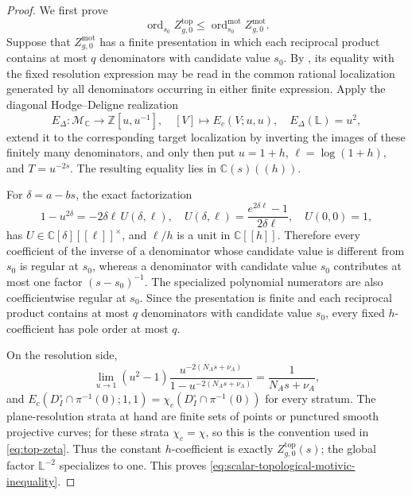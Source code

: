 \documentclass[12pt]{amsart}
\numberwithin{equation}{section}
\theoremstyle{plain}
\theoremstyle{definition}
\theoremstyle{remark}
\theoremstyle{definition}
\DeclareMathOperator{\ord}{ord}
\newcommand{\C}{\mathbb C}
\newcommand{\Z}{\mathbb Z}
\newcommand{\Lef}{\mathbb L}
\newcommand{\Mmot}{\mathcal M_{\mathbb C}}
\begin{document}
\begin{proof}
We first prove
\begin{equation}\label{eq:scalar-topological-motivic-inequality}
 \ord_{s_0}Z^{\mathrm{top}}_{g,0}\leq\ord_{s_0}^{\mathrm{mot}}Z^{\mathrm{mot}}_{g,0}.
\end{equation}
Suppose that $Z^{\mathrm{mot}}_{g,0}$ has a finite presentation in which each reciprocal product contains at most $q$ denominators with candidate value $s_0$. By , its equality with the fixed resolution expression may be read in the common rational localization generated by all denominators occurring in either finite expression. Apply the diagonal Hodge--Deligne realization \cite[\S4.2]{DenefLoeser1998}
\begin{equation*}
E_\Delta:\Mmot\to \Z[u,u^{-1}],
 \quad [V]\mapsto  E_c(V;u,u),
 \quad E_\Delta(\Lef)=u^2,
\end{equation*}
extend it to the corresponding target localization by inverting the images of these finitely many denominators, and only then put $u=1+h$, $\ell=\log(1+h)$, and $T=u^{-2s}$. The resulting equality lies in $\C(s)((h))$.

For $\delta=a-bs$, the exact factorization
\begin{equation*}
1-u^{2\delta}=-2\delta\ell\,U(\delta,\ell),
 \quad U(\delta,\ell)=\frac{e^{2\delta\ell}-1}{2\delta\ell},
 \quad U(0,0)=1,
\end{equation*}
has $U\in\C[\delta][\![\ell]\!]^\times$, and $\ell/h$ is a unit in $\C[\![h]\!]$. Therefore every coefficient of the inverse of a denominator whose candidate value is different from $s_0$ is regular at $s_0$, whereas a denominator with candidate value $s_0$ contributes at most one factor $(s-s_0)^{-1}$. The specialized polynomial numerators are also coefficientwise regular at $s_0$. Since the presentation is finite and each reciprocal product contains at most $q$ denominators with candidate value $s_0$, every fixed $h$-coefficient has pole order at most $q$. 

On the resolution side,
\begin{equation*}
\lim_{u\to1}(u^2-1)\frac{u^{-2(N_As+\nu_A)}}{1-u^{-2(N_As+\nu_A)}}=\frac1{N_As+\nu_A},
\end{equation*}
and $E_c(D_I^\circ\cap\pi^{-1}(0);1,1)=\chi_c(D_I^\circ\cap\pi^{-1}(0))$ for every stratum. The plane-resolution strata at hand are finite sets of points or punctured smooth projective curves; for these strata $\chi_c=\chi$, so this is the convention used in \eqref{eq:top-zeta}. Thus the constant $h$-coefficient is exactly $Z^{\mathrm{top}}_{g,0}(s)$; the global factor $\Lef^{-2}$ specializes to one. This proves \eqref{eq:scalar-topological-motivic-inequality}.


\end{proof}
\end{document}
